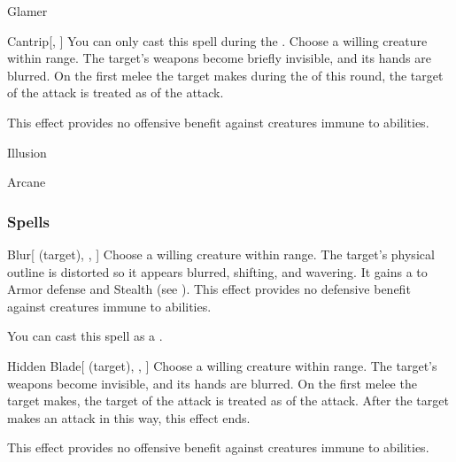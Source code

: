 \newpage
\begin{spellsection}{Glamer}

\begin{spellheader}
\spelldesc{}
\end{spellheader}


\begin{ability}{Cantrip}[, ]
You can only cast this spell during the .
Choose a willing creature within \rngclose range.
The target's weapons become briefly invisible, and its hands are blurred.
On the first melee  the target makes during the  of this round, the target of the attack is treated as  of the attack.

This effect provides no offensive benefit against creatures immune to  abilities.
\end{ability}




 Illusion

 Arcane
\end{spellsection}


\subsubsection{Spells}


\lowercase{\hypertarget{spell:Blur}{}}\label{spell:Blur}
\begin{ability}[\nth{1}]{\hypertarget{spell:Blur}{Blur}}[ (target), , ]
Choose a willing creature within \rngmed range.
The target's physical outline is distorted so it appears blurred, shifting, and wavering.
It gains a   to Armor defense and Stealth (see ).
This effect provides no defensive benefit against creatures immune to  abilities.

You can cast this spell as a .
\end{ability}
\vspace{0.25em}



\lowercase{\hypertarget{spell:Hidden Blade}{}}\label{spell:Hidden Blade}
\begin{ability}[\nth{1}]{\hypertarget{spell:Hidden Blade}{Hidden Blade}}[ (target), , ]
Choose a willing creature within \rngclose range.
The target's weapons become invisible, and its hands are blurred.
On the first melee  the target makes, the target of the attack is treated as  of the attack.
After the target makes an attack in this way, this effect ends.

This effect provides no offensive benefit against creatures immune to  abilities.
\end{ability}
\vspace{0.25em}



